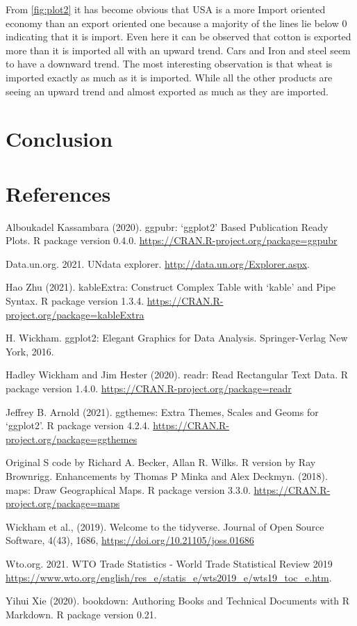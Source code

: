 \documentclass[11pt,a4paper,]{article}
\begin{document}
From \ref{fig:plot2} it has become obvious that USA is a more Import oriented economy than an export oriented one because a majority of the lines lie below 0 indicating that it is import. Even here it can be observed that cotton is exported more than it is imported all with an upward trend. Cars and Iron and steel seem to have a downward trend. The most interesting observation is that wheat is imported exactly as much as it is imported. While all the other products are seeing an upward trend and almost exported as much as they are imported.

\section*{Conclusion}

\section*{References}

Alboukadel Kassambara (2020). ggpubr: `ggplot2' Based Publication Ready Plots. R
package version 0.4.0. \url{https://CRAN.R-project.org/package=ggpubr}

Data.un.org. 2021. UNdata \textbar{} explorer. \url{http://data.un.org/Explorer.aspx}.

Hao Zhu (2021). kableExtra: Construct Complex Table with `kable' and Pipe Syntax. R
package version 1.3.4. \url{https://CRAN.R-project.org/package=kableExtra}

H. Wickham. ggplot2: Elegant Graphics for Data Analysis. Springer-Verlag New York,
2016.

Hadley Wickham and Jim Hester (2020). readr: Read Rectangular Text Data. R package
version 1.4.0. \url{https://CRAN.R-project.org/package=readr}

Jeffrey B. Arnold (2021). ggthemes: Extra Themes, Scales and Geoms for `ggplot2'. R
package version 4.2.4. \url{https://CRAN.R-project.org/package=ggthemes}

Original S code by Richard A. Becker, Allan R. Wilks. R version by Ray Brownrigg.
Enhancements by Thomas P Minka and Alex Deckmyn. (2018). maps: Draw Geographical
Maps. R package version 3.3.0. \url{https://CRAN.R-project.org/package=maps}

Wickham et al., (2019). Welcome to the tidyverse. Journal of Open Source Software,
4(43), 1686, \url{https://doi.org/10.21105/joss.01686}

Wto.org. 2021. WTO \textbar{} Trade Statistics - World Trade Statistical Review 2019 \url{https://www.wto.org/english/res_e/statis_e/wts2019_e/wts19_toc_e.htm}.

Yihui Xie (2020). bookdown: Authoring Books and Technical Documents with R Markdown. R
package version 0.21.

\printbibliography
\end{document}
